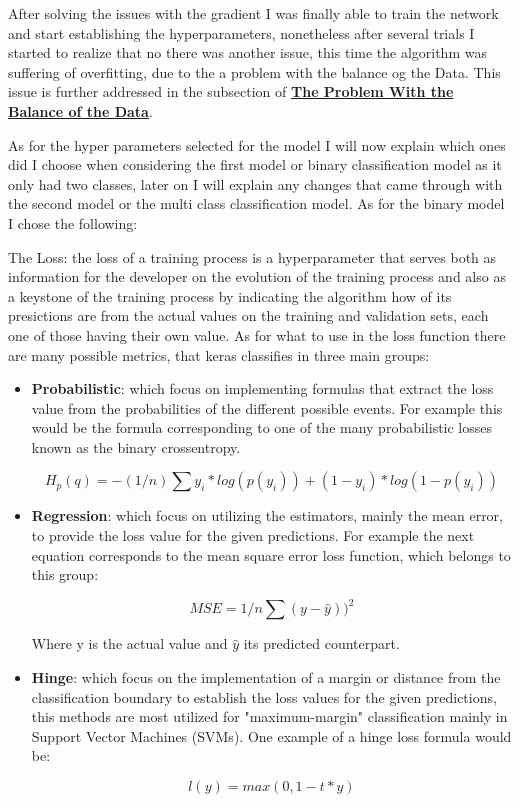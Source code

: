 \documentclass[12pt, a4paper]{article}
\begin{document}
	After solving the issues with the gradient I was finally able to train the network and start establishing the hyperparameters, nonetheless after several trials I started to realize that no there was another issue, this time the algorithm was suffering of overfitting, due to the a problem with the balance og the Data. This issue is further addressed in the subsection of \hyperref[sec:problemUnbalanceData]{\textbf{The Problem With the Balance of the Data}}.
	
	As for the hyper parameters selected for the model I will now explain which ones did I choose when considering the first model or binary classification model as it only had two classes, later on I will explain any changes that came through with the second model or the multi class classification model. As for the binary model I chose the following:
	
	The Loss: the loss of a training process is a hyperparameter that serves both as information for the developer on the evolution of the training process and also as a keystone of the training process by indicating the algorithm how of its presictions are from the actual values on the training and validation sets, each one of those having their own value. As for what to use in the loss function there are many possible metrics, that keras classifies in three main groups:\cite{kerasDocs}
	
	\begin{itemize}
		\item \textbf{Probabilistic}: which focus on implementing formulas that extract the loss value from the probabilities of the different possible events. For example this would be the formula corresponding to one of the many probabilistic losses known as the binary crossentropy.\cite{binnaryCrossentropy}
		
		\[ H_p(q) = -(1/n) \sum y_i * log(p(y_i)) + (1-y_i)*log(1-p(y_i)) \]
		
		\item\textbf{Regression}: which focus on utilizing the estimators, mainly the mean error, to provide the loss value for the given predictions. For example the next equation corresponds to the mean square error loss function, which belongs to this group:
		
		\[ MSE = 1/n \sum(y - \hat y))^2 \]
		
		Where y is the actual value and $\hat y$ its predicted counterpart.
		
		
		\clearpage
		
		\item\textbf{Hinge}: which focus on the implementation of a margin or distance from the classification boundary to establish the loss values for the given predictions, this methods are most utilized for "maximum-margin" classification mainly in Support Vector Machines (SVMs). One example of a hinge loss formula would be:
		
		\[ l(y) = max(0,1 - t * y)\]
		
	\end{itemize}
\end{document}
